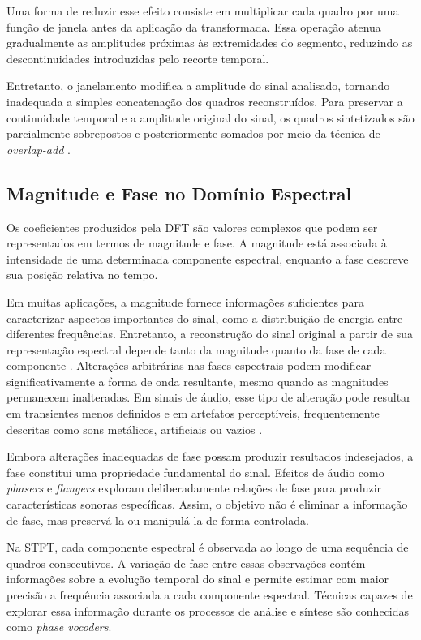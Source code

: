 Uma forma de reduzir esse efeito consiste em multiplicar cada quadro por uma função de janela antes da aplicação da transformada. Essa operação atenua gradualmente as amplitudes próximas às extremidades do segmento, reduzindo as descontinuidades introduzidas pelo recorte temporal.

Entretanto, o janelamento modifica a amplitude do sinal analisado, tornando inadequada a simples concatenação dos quadros reconstruídos. Para preservar a continuidade temporal e a amplitude original do sinal, os quadros sintetizados são parcialmente sobrepostos e posteriormente somados por meio da técnica de \textit{overlap-add} \cite{griffin1984}.

\subsection{Magnitude e Fase no Domínio Espectral}

Os coeficientes produzidos pela DFT são valores complexos que podem ser representados em termos de magnitude e fase. A magnitude está associada à intensidade de uma determinada componente espectral, enquanto a fase descreve sua posição relativa no tempo.

Em muitas aplicações, a magnitude fornece informações suficientes para caracterizar aspectos importantes do sinal, como a distribuição de energia entre diferentes frequências. Entretanto, a reconstrução do sinal original a partir de sua representação espectral depende tanto da magnitude quanto da fase de cada componente \cite{dolson1986}. Alterações arbitrárias nas fases espectrais podem modificar significativamente a forma de onda resultante, mesmo quando as magnitudes permanecem inalteradas. Em sinais de áudio, esse tipo de alteração pode resultar em transientes menos definidos e em artefatos perceptíveis, frequentemente descritas como sons metálicos, artificiais ou vazios \cite{laroche1999}.


Embora alterações inadequadas de fase possam produzir resultados indesejados, a fase constitui uma propriedade fundamental do sinal. Efeitos de áudio como \textit{phasers} e \textit{flangers} exploram deliberadamente relações de fase para produzir características sonoras específicas. Assim, o objetivo não é eliminar a informação de fase, mas preservá-la ou manipulá-la de forma controlada.

Na STFT, cada componente espectral é observada ao longo de uma sequência de quadros consecutivos. A variação de fase entre essas observações contém informações sobre a evolução temporal do sinal e permite estimar com maior precisão a frequência associada a cada componente espectral. Técnicas capazes de explorar essa informação durante os processos de análise e síntese são conhecidas como \textit{phase vocoders}.

